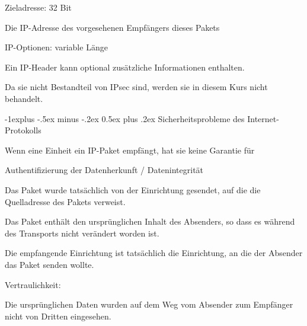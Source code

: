 \documentclass[a4paper]{article}
\makeatletter
\renewcommand{\subsection}{\@startsection{subsection}{2}{0mm}%
 {-1explus -.5ex minus -.2ex}%
 {0.5ex plus .2ex}%
 {\normalfont\normalsize\bfseries}}
\makeatother
\begin{document}
\begin{multicols}{3}
\begin{itemize*}
            \item Zieladresse: 32 Bit
            \begin{itemize*}
                  \item Die IP-Adresse des vorgesehenen Empfängers dieses Pakets
            \end{itemize*}
            \item IP-Optionen: variable Länge
            \begin{itemize*}
                  \item Ein IP-Header kann optional zusätzliche Informationen enthalten.
                  \item Da sie nicht Bestandteil von IPsec sind, werden sie in diesem Kurs nicht behandelt.
            \end{itemize*}
      \end{itemize*}

      \subsection{Sicherheitsprobleme des Internet-Protokolls}
      \begin{itemize*}
            \item Wenn eine Einheit ein IP-Paket empfängt, hat sie keine Garantie für
            \item Authentifizierung der Datenherkunft / Datenintegrität
            \begin{itemize*}
                  \item Das Paket wurde tatsächlich von der Einrichtung gesendet, auf die die Quelladresse des Pakets verweist.
                  \item Das Paket enthält den ursprünglichen Inhalt des Absenders, so dass es während des Transports nicht verändert worden ist.
                  \item Die empfangende Einrichtung ist tatsächlich die Einrichtung, an die der Absender das Paket senden wollte.
            \end{itemize*}
            \item Vertraulichkeit:
            \begin{itemize*}
                  \item Die ursprünglichen Daten wurden auf dem Weg vom Absender zum Empfänger nicht von Dritten eingesehen.
            \end{itemize*}
      \end{itemize*}


\end{multicols}
\end{document}
